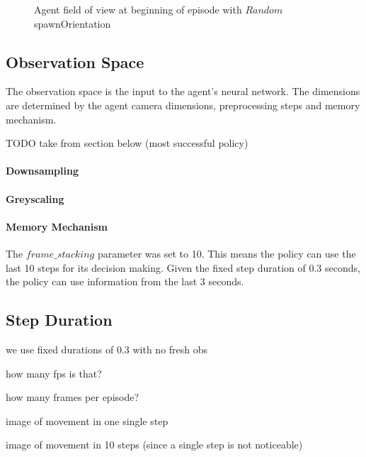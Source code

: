 \begin{figure}
    \centering
    \qquad
    \qquad
    \qquad
    \caption{Agent field of view at beginning of episode with $Random$ spawnOrientation}
    \label{fig:agent_field_of_view}
\end{figure}


\subsection{Observation Space}

The observation space is the input to the agent's neural network. The dimensions are determined by the agent camera dimensions, preprocessing steps and memory mechanism.

TODO take from section below (most successful policy)

\paragraph{Downsampling}

\paragraph{Greyscaling}

\paragraph{Memory Mechanism}
The $frame\_stacking$ parameter was set to 10. This means the policy can use the last 10 steps for its decision making. Given the fixed step duration of 0.3 seconds, the policy can use information from the last 3 seconds.

\subsection{Step Duration}


we use fixed durations of 0.3 with no fresh obs

how many fps is that?

how many frames per episode?

image of movement in one single step

image of movement in 10 steps (since a single step is not noticeable)

